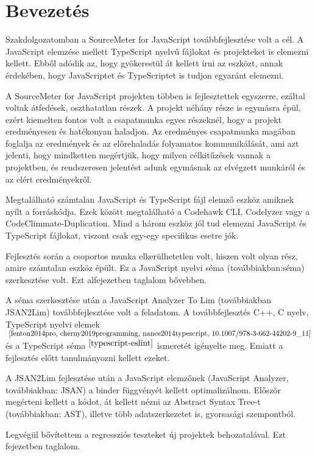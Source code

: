 \chapter{Bevezetés}

\noindent

Szakdolgozatomban a SourceMeter for JavaScript továbbfejlesztése volt a cél.
A JavaScript elemzése mellett TypeScript nyelvű fájlokat és projekteket is elemezni kellett.
Ebből adódik az, hogy gyökerestül át kellett írni az eszközt, annak érdekében,
hogy JavaScriptet és TypeScriptet is tudjon egyaránt elemezni.

\noindent

A SourceMeter for JavaScript projekten többen is fejlesztettek egyszerre, ezáltal voltak átfedések, oszthatatlan részek.
A projekt néhány része is egymásra épül, ezért kiemelten fontos volt a csapatmunka egyes részeknél, hogy a projekt eredményesen és hatékonyan haladjon.
Az eredményes csapatmunka magában foglalja az eredmények és az előrehaladás folyamatos kommunikálását,
ami azt jelenti, hogy mindketten megértjük, hogy milyen célkitűzések vannak a projektben,
és rendszeresen jelentést adunk egymásnak az elvégzett munkáról és az elért eredményekről.

\noindent

Megtalálható számtalan JavaScript és TypeScript fájl elemző eszköz amiknek nyílt a forráskódja.
Ezek között megtalálható a Codehawk CLI, Codelyzer vagy a CodeClimmate-Duplication.
Mind a három eszköz jól tud elemezni JavaScript és TypeScript fájlokat, viszont csak egy-egy specifikus esetre jók.

\noindent

Fejlesztés során a csoportos munka elkerülhetetlen volt, hiszen volt olyan rész, amire számtalan eszköz épült.
Ez a JavaScript nyelvi séma (továbbiakban:séma) szerkesztése volt. Ezt  alfejezetben taglalom bővebben.

\noindent

A séma szerkesztése után a JavaScript Analyzer To Lim (továbbiakban JSAN2Lim) továbbfejlesztése volt a feladatom.
A továbbfejlesztés C++, C nyelv, TypeScript nyelvi elemek$^{~\cite{fenton2014pro, cherny2019programming, nance2014typescript, 10.1007/978-3-662-44202-9_11}}$ és a TypeScript séma$^{~\cite{typescript-eslint}}$ ismeretét igényelte meg.
Emiatt a fejlesztés előtt tanulmányozni kellett ezeket.

\noindent

A JSAN2Lim fejlesztése után a JavaScript elemzőnek (JavaScript Analyzer, továbbiakban: JSAN) a binder függvényét kellett optimalizálnom.
Először megérteni kellett a kódot, át kellett nézni az Abstract Syntax Tree-t (továbbiakban: AST), illetve több adatszerkezetet is, gyorsasági szempontból.

\noindent

Legvégül bővítettem a regressziós teszteket új projektek behozatalával. Ezt  fejezetben taglalom.

